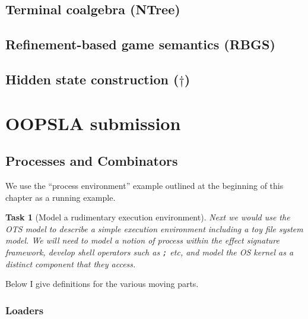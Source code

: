 \documentclass{report}
\newtheorem{task}{Task}[chapter]
\begin{document}
\subsection{Terminal coalgebra (NTree)}

\subsection{Refinement-based game semantics (RBGS)}

\subsection{Hidden state construction ($\dagger$)}


\section{OOPSLA submission} %

\subsection{Processes and Combinators}

We use the ``process environment'' example
outlined at the beginning of this chapter
as a running example.

\begin{task}[Model a rudimentary execution environment]
Next we would use the OTS model to describe a simple execution environment
including a toy file system model.
We will need to model a notion of process within the effect signature framework,
develop shell operators such as \texttt{;} etc, and
model the OS kernel as a distinct component that they access.
\end{task}

\noindent
Below I give definitions for the various moving parts.

\subsubsection{Loaders}
\end{document}

